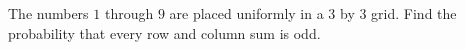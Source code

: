 The numbers $1$ through $9$ are placed uniformly in a $3$ by $3$ grid. Find the probability that every row and column sum is odd.
